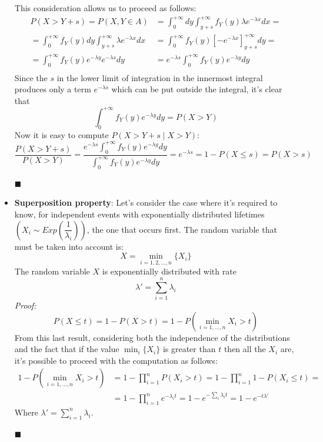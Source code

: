 \documentclass[12pt,a4paper]{article}
\begin{document}
\begin{itemize}
\begin{figure}[H]
\begin{center}
\label{fig:extmemlessarea}
\end{center}
\end{figure}
This consideration allows us to proceed as follows:
\begin{align*}
P(X>Y+s) = P(X,Y\in A) &= \int_{0}^{+\infty}dy\int_{y+s}^{+\infty}f_Y(y)\lambda e^{-\lambda x}dx= \\
=\int_{0}^{+\infty}f_Y(y)dy\int_{y+s}^{+\infty}\lambda e^{-\lambda x}dx &=\int_{0}^{+\infty}f_Y(y)
\left[-e^{-\lambda x}\right]^{+\infty}_{y+s}dy = \\
=\int_{0}^{+\infty}f_Y(y)e^{-\lambda y}e^{-\lambda s}dy &= e^{-\lambda s}
\int_{0}^{+\infty}f_Y(y)e^{-\lambda y}dy\\
\end{align*}
Since the $s$ in the lower limit of integration in the innermost integral produces only a term 
$e^{-\lambda s}$ which can be put outside the integral, it's clear that
$$
\int_{0}^{+\infty}f_Y(y)e^{-\lambda y}dy = P(X>Y)
$$
Now it is easy to compute $P(X>Y+s \mid X>Y)$:
$$
\frac{P(X>Y+s)}{P(X>Y)} = \frac{e^{-\lambda s}\int_{0}^{+\infty}f_Y(y)e^{-\lambda y}dy }
{\int_{0}^{+\infty}f_Y(y)e^{-\lambda y}dy } = e^{-\lambda s} = 1-P(X\leq s) = P(X>s)
$$
\begin{flushright}
$\blacksquare$
\end{flushright}

\item \textbf{Superposition property}:
Let's consider the case where it's required to know, for independent events with exponentially distributed lifetimes $\left( X_i\sim Exp\left(\dfrac{1}{\lambda_i}\right)\right)$, the one that occurs first. The random variable that must be taken into account is:
$$
X=\min_{i=1,2,\dots,n}{\{X_i\}}
$$ 
The random variable $X$ is exponentially distributed with rate 
$$
\lambda '=\sum_{i=1}^{n}\lambda_i
$$
\emph{Proof:}
$$
P(X\leq t) = 1-P(X>t) = 1-P(\min_{i=1,\dots,n}{X_i}>t)
$$
From this last result, considering both the independence of the distributions and the fact that if the value $\min_i{\{X_i\}}$ is greater than $t$ then all the $X_i$ are, it's possible to proceed with the computation as follows:
\begin{align*}
1-P(\min_{i=1,\dots,n}{X_i}>t) &= 1-\prod_{i=1}^{n}{P(X_i>t)} = 1-\prod_{i=1}^{n}{1-P(X_i\leq t)} =
\\
&= 1-\prod_{i=1}^{n}{e^{-\lambda_{i}t}} = 1-e^{-\sum_{i}{\lambda_i t}} = 1-e^{-t\lambda'}
\end{align*}
Where $\lambda' = \sum_{i=1}^{n}{\lambda_i}$.
\begin{flushright}
$\blacksquare$
\end{flushright}
\end{itemize}
\end{document}
